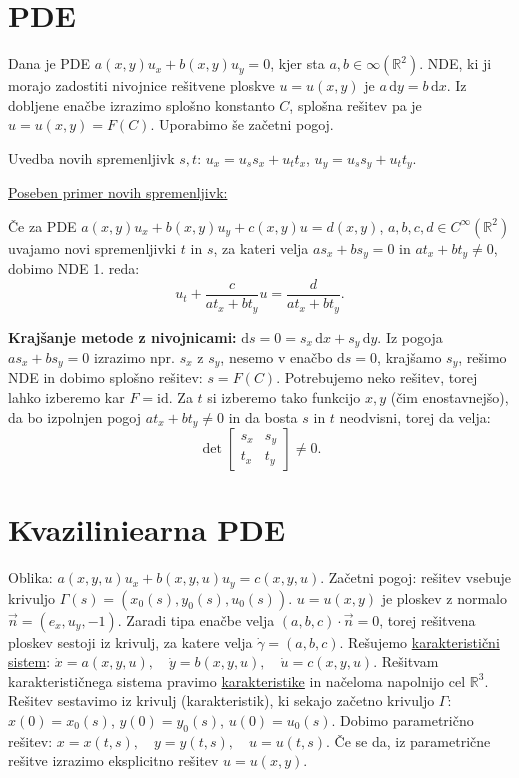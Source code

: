 \documentclass[10pt,a4paper]{amsart}
\theoremstyle{definition} %
\theoremstyle{plain} %
\newcommand{\dx}{\ensuremath{\,\mathrm{d}x}}
\newcommand{\dy}{\ensuremath{\,\mathrm{d}y}}
\newcommand{\R}{\mathbb R}
\begin{document}
\thispagestyle{empty}
\setlength{\parindent}{0pt}


\section*{PDE}

Dana je PDE $a(x,y)u_x + b(x,y)u_y = 0$, kjer sta $a,b \in {\infty}(\R^2)$. NDE,
ki ji morajo zadostiti nivojnice rešitvene ploskve $u = u(x,y)$ je $a\dy =
b\dx$. Iz dobljene enačbe izrazimo splošno konstanto $C$, splošna rešitev pa je
$u = u(x,y) = F(C)$. Uporabimo še začetni pogoj.

Uvedba novih spremenljivk $s,t$: $u_x = u_s s_x + u_t t_x$, $u_y = u_s s_y + u_t
t_y$.

\underline{Poseben primer novih spremenljivk:}

Če za PDE $a(x,y)u_x + b(x,y)u_y + c(x,y)u = d(x,y)$, $a,b,c,d \in
C^{\infty}(\R^2)$ uvajamo novi spremenljivki $t$ in $s$, za kateri velja $as_x +
bs_y = 0$ in $at_x + bt_y \neq 0$, dobimo NDE 1. reda: $$ u_t + \frac{c}{at_x +
bt_y}u = \frac{d}{at_x + bt_y}.  $$

\textbf{Krajšanje metode z nivojnicami:} $\text{d}s = 0 = s_x \dx + s_y \dy$. Iz
pogoja $as_x + bs_y = 0$ izrazimo npr. $s_x$ z $s_y$, nesemo v enačbo $\text{d}s
= 0$, krajšamo $s_y$, rešimo NDE in dobimo splošno rešitev: $s = F(C)$.
Potrebujemo neko rešitev, torej lahko izberemo kar $F = \text{id}$. Za $t$ si
izberemo tako funkcijo $x,y$ (čim enostavnejšo), da bo izpolnjen pogoj $at_x +
bt_y \neq 0$ in da bosta $s$ in $t$ neodvisni, torej da velja: $$ \det
\begin{bmatrix} s_x & s_y \\ t_x & t_y \end{bmatrix} \neq 0.  $$

\section*{Kvaziliniearna PDE}

Oblika: $a(x,y,u)u_x + b(x,y,u)u_y = c(x,y,u)$. Začetni pogoj: rešitev vsebuje
krivuljo $\Gamma (s) = (x_0(s),y_0(s),u_0(s))$. $u = u(x,y)$ je ploskev z
normalo $\vec{n} = (e_x,u_y,-1)$. Zaradi tipa enačbe velja $(a,b,c)\cdot \vec{n}
= 0$, torej rešitvena ploskev sestoji iz krivulj, za katere velja $\dot{\gamma}
= (a,b,c)$. Rešujemo \underline{karakteristični sistem}: $ \dot{x}
=a(x,y,u),\quad \dot{y} =b(x,y,u),\quad \dot{u} =c(x,y,u).  $ Rešitvam
karakterističnega sistema pravimo \underline{karakteristike} in načeloma
napolnijo cel $\R^3$. Rešitev sestavimo iz krivulj (karakteristik), ki sekajo
začetno krivuljo $\Gamma$: $x(0) = x_0(s)$, $y(0) = y_0(s)$, $u(0) = u_0(s)$.
Dobimo parametrično rešitev: $ x =x(t,s) ,\quad y =y(t,s) ,\quad u =u(t,s).  $
Če se da, iz parametrične rešitve izrazimo eksplicitno rešitev $u = u(x,y)$.
\end{document}
